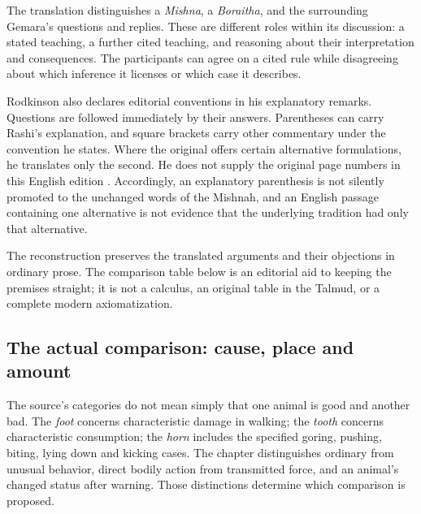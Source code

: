 The translation distinguishes a \emph{Mishna}, a \emph{Boraitha}, and
the surrounding Gemara's questions and replies. These are different
roles within its discussion: a stated teaching, a further cited
teaching, and reasoning about their interpretation and consequences.
The participants can agree on a cited rule while disagreeing about
which inference it licenses or which case it describes.

Rodkinson also declares editorial conventions in his explanatory
remarks. Questions are followed immediately by their answers.
Parentheses can carry Rashi's explanation, and square brackets carry
other commentary under the convention he states. Where the original
offers certain alternative formulations, he translates only the second.
He does not supply the original page numbers in this English edition
\parencite[Explanatory Remarks, p.~ii]{RodkinsonBabaKamaCopyright1900}.
Accordingly, an explanatory parenthesis is not silently promoted to
the unchanged words of the Mishnah, and an English passage containing
one alternative is not evidence that the underlying tradition had
only that alternative.

The reconstruction preserves the translated arguments and their
objections in ordinary prose. The comparison table below is an
editorial aid to keeping the premises straight; it is not a calculus,
an original table in the Talmud, or a complete modern axiomatization.

\subsection{The actual comparison: cause, place and amount}
\label{sec:p18-talmudic-damage-premises}

The source's categories do not mean simply that one animal is good and
another bad. The \emph{foot} concerns characteristic damage in walking;
the \emph{tooth} concerns characteristic consumption; the \emph{horn}
includes the specified goring, pushing, biting, lying down and kicking
cases. The chapter distinguishes ordinary from unusual behavior,
direct bodily action from transmitted force, and an animal's changed
status after warning. Those distinctions determine which comparison
is proposed.

